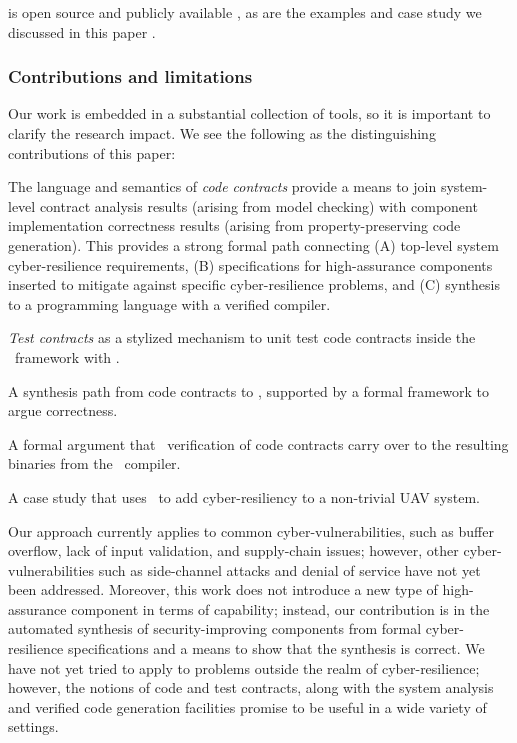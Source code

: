 {\brfcs} is open source and publicly available \cite{fmide}, as are the
examples and case study we discussed in this paper \cite{repo,
phase2, camkes, case}.

\subsubsection*{Contributions and limitations}

Our work is embedded in a substantial collection of tools, so it is
important to clarify the research impact. We see the following
as the distinguishing contributions of this paper:

\begin{compactitem}
  \item The language and semantics of \emph{code contracts} provide a
  means to join system-level contract analysis results (arising from
  model checking) with component implementation correctness results
  (arising from property-preserving code generation). This provides a
  strong formal path connecting (A) top-level system cyber-resilience
  requirements, (B) specifications for high-assurance components inserted
  to mitigate against specific cyber-resilience problems, and (C) synthesis
  to a programming language with a verified compiler.

\item \emph{Test contracts} as a
  stylized mechanism to unit test code contracts inside the \brfcs\
  framework with \agr.

\item A synthesis path from code contracts to \ckml, supported by a formal
   framework to argue correctness.

\item A formal argument that \agr\ verification of code contracts carry over
  to the resulting binaries from the \ckml\ compiler.

\item A case
  study that uses \brfcs\ to add cyber-resiliency to a non-trivial UAV
  system.
\end{compactitem}

Our approach currently applies to common cyber-vulnerabilities, such
as buffer overflow, lack of input validation, and supply-chain issues;
however, other cyber-vulnerabilities such as side-channel attacks and
denial of service have not yet been addressed. Moreover, this work
does not introduce a new type of high-assurance component in terms of
capability; instead, our contribution is in the automated synthesis of
security-improving components from formal cyber-resilience
specifications and a means to show that the synthesis is correct. We
have not yet tried to apply {\brfcs} to problems outside the realm of
cyber-resilience; however, the notions of code and test contracts,
along with the system analysis and verified code generation facilities
promise to be useful in a wide variety of settings.

